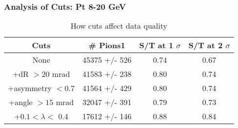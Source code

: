 \frame
{
\frametitle{Analysis of Cuts: Pt 8-20 GeV}
\begin{table}
\caption{How cuts affect data quality}
\centering
\begin{tabular}{c c c c}
\hline\hline
Cuts & \# Pions1 & S/T at 1 $\sigma$ & S/T at 2 $\sigma$ \\ [0.5ex]
\hline
None & 45375 +/-  526 & 0.74 & 0.67 \\ %
+dR $> 20$ mrad & 41583 +/-  238 & 0.80 & 0.74 \\ %
+asymmetry $< 0.7$ & 41564 +/-  429 & 0.80 & 0.74 \\ %
+angle $> 15$ mrad & 32047 +/-  391 & 0.79 & 0.73 \\ %
+$0.1 < \lambda <$ 0.4 & 17612 +/-  146 & 0.88 & 0.84 \\ %
[1ex]
\hline
\end{tabular}
\label{table:nonlin}
\end{table}
}
